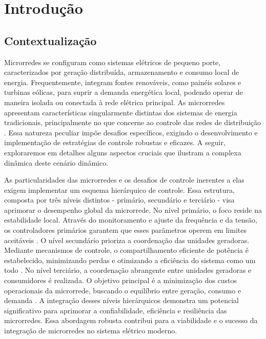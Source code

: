 
\chapter{Introdução}

\section{Contextualização}

Microrredes se configuram como sistemas elétricos de pequeno porte, caracterizados por geração distribuída, armazenamento e consumo local de energia. Frequentemente, integram fontes renováveis, como painéis solares e turbinas eólicas, para suprir a demanda energética local, podendo operar de maneira isolada ou conectada à rede elétrica principal. As microrredes apresentam características singularmente distintas dos sistemas de energia tradicionais, principalmente no que concerne ao controle das redes de distribuição \citep{Paigi2013}. Essa natureza peculiar impõe desafios específicos, exigindo o desenvolvimento e implementação de estratégias de controle robustas e eficazes. A seguir, exploraremos em detalhes alguns aspectos cruciais que ilustram a complexa dinâmica deste cenário dinâmico.

As particularidades das microrredes e os desafios de controle inerentes a elas exigem implementar um esquema hierárquico de controle. Essa estrutura, composta por três níveis distintos - primário, secundário e terciário - visa aprimorar o desempenho global da microrrede. No nível primário, o foco reside na estabilidade local. Através do monitoramento e ajuste da frequência e da tensão, os controladores primários garantem que esses parâmetros operem em limites aceitáveis \citep{Paigi2013}. O nível secundário prioriza a coordenação das unidades geradoras. Mediante mecanismos de controle, o compartilhamento eficiente de potência é estabelecido, minimizando perdas e otimizando a eficiência do sistema como um todo \citep{Paigi2013}. No nível terciário, a coordenação abrangente entre unidades geradoras e consumidores é realizada. O objetivo principal é a minimização dos custos operacionais da microrrede, buscando o equilíbrio entre geração, consumo e demanda \citep{Paigi2013}. A integração desses níveis hierárquicos demonstra um potencial significativo para aprimorar a confiabilidade, eficiência e resiliência das microrredes. Essa abordagem robusta contribui para a viabilidade e o sucesso da integração de microrredes no sistema elétrico moderno.

